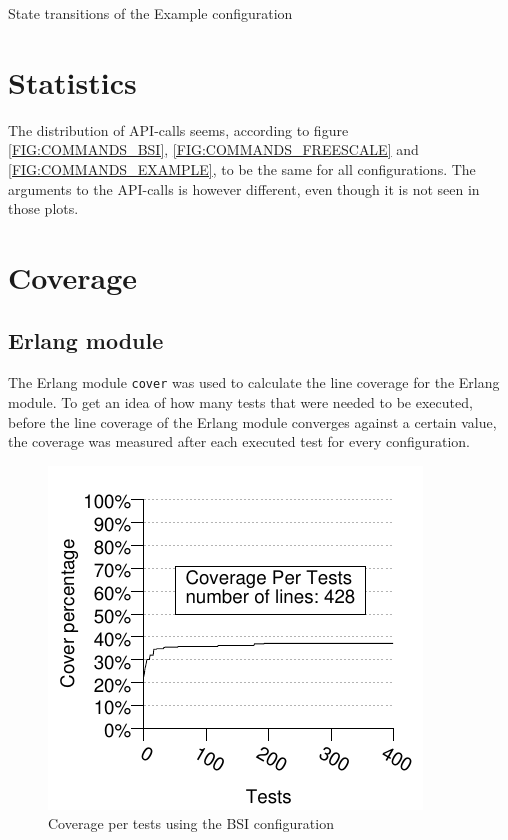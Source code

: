 \begin{table}[!ht]
  \caption{State transitions of the Example configuration}
  \label{TABLE:STATUSES_EXAMPLE}
  
\end{table}

\section{Statistics}
The distribution of API-calls seems, according to figure
\ref{FIG:COMMANDS_BSI}, \ref{FIG:COMMANDS_FREESCALE} and
\ref{FIG:COMMANDS_EXAMPLE}, to be the same for all configurations. The
arguments to the API-calls is however different, even though it is not
seen in those plots.

\section{Coverage}
\label{SEC:COVERAGE}
\subsection{Erlang module}
\newcommand{\linecoverage}{97.38\%}
\newcommand{\bullseyecoverage}{85.64\%}
The Erlang module \lstinline!cover! was used to calculate the line
coverage for the Erlang module. To get an idea of how many tests that
were needed to be executed, before the line coverage of the Erlang module
converges against a certain value, the coverage was measured after
each executed test for every configuration.

\begin{figure}[!ht]
\begin{center}
\includegraphics{generated_pictures/coverage_per_tests_bsi.pdf}
\end{center}
\caption{Coverage per tests using the BSI configuration}
\label{FIG:COV_PER_TESTS_BSI}
\end{figure}

